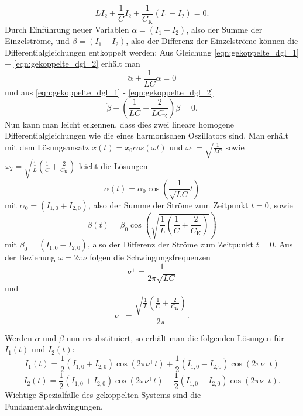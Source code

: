 \begin{equation}
  L \ddot{I_2} + \frac{1}{C} I_2 + \frac{1}{C_\text{K}} (I_1 - I_2) = 0.
  \label{eqn:gekoppelte_dgl_2}
\end{equation}
Durch Einführung neuer Variablen $\alpha = (I_1 + I_2)$, also der Summe der
Einzelströme, und $\beta = (I_1 - I_2)$, also der Differenz der Einzelströme
können die Differentialgleichungen entkoppelt werden:
Aus Gleichung \eqref{eqn:gekoppelte_dgl_1} + \eqref{eqn:gekoppelte_dgl_2} erhält
man
\begin{equation}
  \ddot{\alpha} + \frac{1}{L C} \alpha = 0
  \label{eqn:dgl1}
\end{equation}
und aus \eqref{eqn:gekoppelte_dgl_1} - \eqref{eqn:gekoppelte_dgl_2}
\begin{equation}
  \ddot{\beta} + \left(\frac{1}{L C} + \frac{2}{L C_\text{K}}\right) \beta = 0.
  \label{eqn:dgl2}
\end{equation}
Nun kann man leicht erkennen, dass dies zwei lineare homogene Differentialgleichungen
wie die eines harmonischen Oszillators sind. Man erhält mit dem Lösungsansatz
$x(t) = x_0 cos (\omega t)$ und $\omega_1 = \sqrt{\frac{1}{LC}}$ sowie
$\omega_2 = \sqrt{\frac{1}{L}\left(\frac{1}{C}+\frac{2}{C_\text{K}}\right)}$ leicht die
Lösungen
\begin{equation}
  \alpha(t) = \alpha_0 \cos\left(\frac{1}{\sqrt{L C}}t\right)
  \label{eqn:alpha}
\end{equation}
mit $\alpha_0 = (I_{1,0} + I_{2,0})$, also der Summe der Ströme zum Zeitpunkt
$t = 0$, sowie
\begin{equation}
  \beta(t) = \beta_0 \cos\left(\sqrt{\frac{1}{L}\left(\frac{1}{C}+
  \frac{2}{C_\text{K}}\right)}\right)
\end{equation}
mit $\beta_0 = (I_{1,0} - I_{2,0})$, also der Differenz der Ströme zum Zeitpunkt
$t = 0$.
Aus der Beziehung $\omega = 2 \pi \nu$ folgen die Schwingungsfrequenzen
\begin{equation}
  \nu^{+} = \frac{1}{2 \pi \sqrt{L C}}
  \label{eqn:frequenz_puls}
\end{equation}
und
\begin{equation}
  \nu^{-} = \frac{\sqrt{\frac{1}{L}\left(\frac{1}{C}+\frac{2}{C_\text{K}}\right)}}{2 \pi}.
  \label{eqn:frequenz_minus}
\end{equation}

Werden $\alpha$ und $\beta$ nun resubstituiert, so erhält man die folgenden Lösungen
für $I_1(t)$ und $I_2(t)$:
\begin{equation}
  I_1(t) = \frac{1}{2} (I_{1,0} + I_{2,0}) \cos(2\pi\nu^{+}t)
  + \frac{1}{2} (I_{1,0} - I_{2,0}) \cos(2\pi\nu^{-}t)
  \label{eqn:I1}
\end{equation}
\begin{equation}
  I_2(t) = \frac{1}{2} (I_{1,0} + I_{2,0}) \cos(2\pi\nu^{+}t)
  - \frac{1}{2} (I_{1,0} - I_{2,0}) \cos(2\pi\nu^{-}t).
  \label{eqn:I2}
\end{equation}
Wichtige Spezialfälle des gekoppelten Systems sind die Fundamentalschwingungen.


